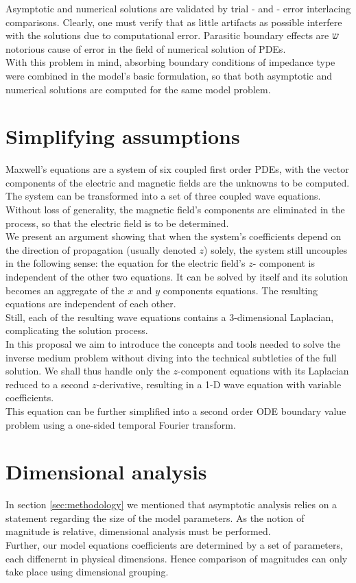 \documentclass[12pt,twoside]{report}
\begin{document}
Asymptotic and numerical solutions are validated by trial - and - error interlacing comparisons. Clearly, one must verify that as little artifacts as possible interfere with the solutions due to computational error. Parasitic boundary effects are ש notorious cause of error in the field of numerical solution of PDEs. \\
With this problem in mind, absorbing boundary conditions of impedance type were combined in the model's basic formulation, so that both asymptotic and numerical solutions are computed for the same model problem.\\
   
\section{Simplifying assumptions}
Maxwell's equations are a  system of six coupled first order PDEs, with the vector components of the electric and magnetic fields are the unknowns to be computed. The system can be transformed into a set of three coupled wave equations. Without loss of generality, the magnetic field's components are eliminated in the process, so that the electric field is to be determined. \\

We present an argument showing that when the system's coefficients depend on the direction of propagation (usually denoted $z$) solely, the system still uncouples in the following sense: the equation for the electric field's $z$- component is independent of the other two equations. It can be solved by itself and its solution becomes an aggregate of the $x$ and $y$ components equations. The resulting equations are independent of each other.\\

Still, each of the resulting wave equations contains a 3-dimensional Laplacian, complicating the solution process.\\
In this proposal we aim to introduce the concepts and tools needed to solve the inverse medium problem without diving into the technical subtleties of the full solution. We shall thus handle only the $z$-component equations with its Laplacian reduced to a second $z$-derivative, resulting in a 1-D wave equation with variable coefficients. \\
This equation can be further simplified into a second order ODE boundary value problem using a one-sided temporal Fourier transform. 

\section{Dimensional analysis}
In section \ref{sec:methodology} we mentioned that asymptotic analysis relies on a statement regarding the size of the model parameters. As the notion of magnitude is relative, dimensional analysis must be performed. \\
Further, our model equations coefficients are determined by a set of parameters, each diffenernt in physical dimensions. Hence comparison of magnitudes can only take place using dimensional grouping.
\end{document}
